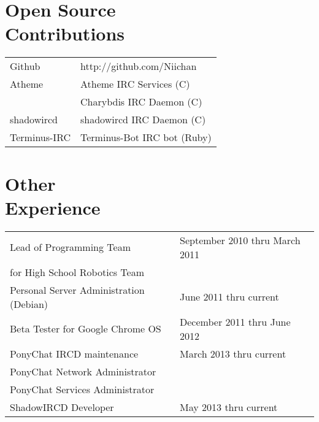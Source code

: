 \documentclass[line, margin, 10pt]{res}
\begin{document}
\begin{resume}
\section{Open Source \\ Contributions}
\begin{tabular}{l l}
Github & http://github.com/Niichan \\ [5pt]
Atheme & Atheme IRC Services (C) \\ [5pt]
& Charybdis IRC Daemon (C) \\ [5pt]
shadowircd & shadowircd IRC Daemon (C) \\ [5pt]
Terminus-IRC & Terminus-Bot IRC bot (Ruby) \\ [5pt]
\end{tabular}

\section{Other \\ Experience}
\begin{tabular}{l l}
 Lead of Programming Team & September 2010 thru March 2011 \\ [5pt]
 for High School Robotics Team & \\ [6pt]
 Personal Server Administration (Debian) & June 2011 thru current  \\ [6pt]
 Beta Tester for Google Chrome OS & December 2011 thru June 2012 \\ [6pt]
 PonyChat IRCD maintenance & March 2013 thru current \\ [5pt]
 PonyChat Network Administrator & \\ [5pt]
 PonyChat Services Administrator & \\ [6pt]
 ShadowIRCD Developer & May 2013 thru current \\ [5pt]
\end{tabular}
     
\end{resume}
\end{document}
